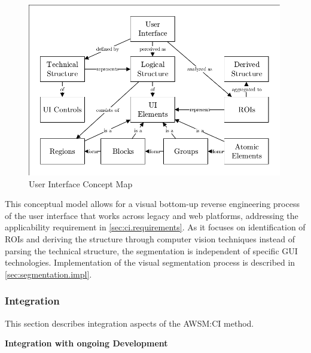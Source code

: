 \begin{figure}
\hypertarget{fig:ci-concepts}{%
\centering
\includegraphics[width=0.99\textwidth]{../figures/awsm-ci-concepts.pdf}
\caption{User Interface Concept Map}\label{fig:ci-concepts}
}
\end{figure}

This conceptual model allows for a visual bottom-up reverse engineering process of the user interface that works across legacy and web platforms, addressing the applicability requirement in \cref{sec:ci.requirements}.
As it focuses on identification of ROIs and deriving the structure through computer vision techniques instead of parsing the technical structure, the segmentation is independent of specific GUI technologies.
Implementation of the visual segmentation process is described in \cref{sec:segmentation.impl}.

\hypertarget{sec:ci.integration}{%
\subsubsection{Integration}\label{sec:ci.integration}}

This section describes integration aspects of the AWSM:CI method.

\textbf{Integration with ongoing Development}

